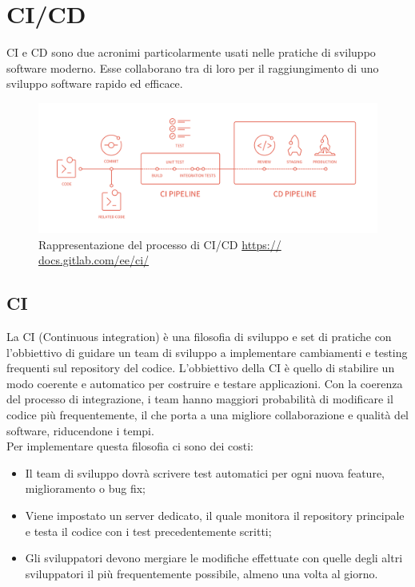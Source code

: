 \section{CI/CD}
\label{CICD}

CI e CD sono due acronimi particolarmente usati nelle pratiche di sviluppo software moderno. Esse collaborano tra di loro per il raggiungimento di uno sviluppo software rapido ed efficace. 

\begin{figure}[H]
\centering
	\includegraphics[width=0.9\linewidth]{./images/cicd_pipeline_gitlab.png} 
	\caption{Rappresentazione del processo di CI/CD \url{ https:// docs.gitlab.com/ee/ci/}}
	\label{vmodel}
\end{figure}

\subsection{CI}

La CI (Continuous integration) è una filosofia di sviluppo e set di pratiche con l'obbiettivo di guidare un team di sviluppo a implementare cambiamenti e testing frequenti sul repository del codice. 
L'obbiettivo della CI è quello di stabilire un modo coerente e automatico per costruire e testare applicazioni. Con la coerenza del processo di integrazione, i team hanno  maggiori probabilità di modificare il codice più frequentemente, il che porta a una migliore collaborazione e qualità del software, riducendone i tempi. \\
Per implementare questa filosofia ci sono dei costi: 
\begin{itemize}
	\item Il team di sviluppo dovrà scrivere test automatici per ogni nuova feature, miglioramento o bug fix;
	\item Viene impostato un server dedicato, il quale monitora il repository principale e testa il codice con i test precedentemente scritti;
	\item Gli sviluppatori devono mergiare le modifiche effettuate con quelle degli altri sviluppatori il più frequentemente possibile, almeno una volta al giorno. 
\end{itemize}

